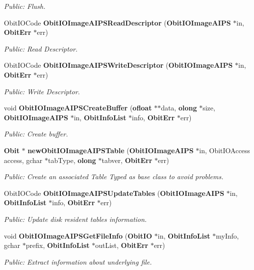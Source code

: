 \begin{CompactItemize}
\begin{CompactList}\small\item\em Public: Flush. \item\end{CompactList}\item 
Obit\-IOCode {\bf Obit\-IOImage\-AIPSRead\-Descriptor} ({\bf Obit\-IOImage\-AIPS} $\ast$in, {\bf Obit\-Err} $\ast$err)
\begin{CompactList}\small\item\em Public: Read Descriptor. \item\end{CompactList}\item 
Obit\-IOCode {\bf Obit\-IOImage\-AIPSWrite\-Descriptor} ({\bf Obit\-IOImage\-AIPS} $\ast$in, {\bf Obit\-Err} $\ast$err)
\begin{CompactList}\small\item\em Public: Write Descriptor. \item\end{CompactList}\item 
void {\bf Obit\-IOImage\-AIPSCreate\-Buffer} ({\bf ofloat} $\ast$$\ast$data, {\bf olong} $\ast$size, {\bf Obit\-IOImage\-AIPS} $\ast$in, {\bf Obit\-Info\-List} $\ast$info, {\bf Obit\-Err} $\ast$err)
\begin{CompactList}\small\item\em Public: Create buffer. \item\end{CompactList}\item 
{\bf Obit} $\ast$ {\bf new\-Obit\-IOImage\-AIPSTable} ({\bf Obit\-IOImage\-AIPS} $\ast$in, Obit\-IOAccess access, gchar $\ast$tab\-Type, {\bf olong} $\ast$tabver, {\bf Obit\-Err} $\ast$err)
\begin{CompactList}\small\item\em Public: Create an associated Table Typed as base class to avoid problems. \item\end{CompactList}\item 
Obit\-IOCode {\bf Obit\-IOImage\-AIPSUpdate\-Tables} ({\bf Obit\-IOImage\-AIPS} $\ast$in, {\bf Obit\-Info\-List} $\ast$info, {\bf Obit\-Err} $\ast$err)
\begin{CompactList}\small\item\em Public: Update disk resident tables information. \item\end{CompactList}\item 
void {\bf Obit\-IOImage\-AIPSGet\-File\-Info} ({\bf Obit\-IO} $\ast$in, {\bf Obit\-Info\-List} $\ast$my\-Info, gchar $\ast$prefix, {\bf Obit\-Info\-List} $\ast$out\-List, {\bf Obit\-Err} $\ast$err)
\begin{CompactList}\small\item\em Public: Extract information about underlying file. \item\end{CompactList}\end{CompactItemize}


